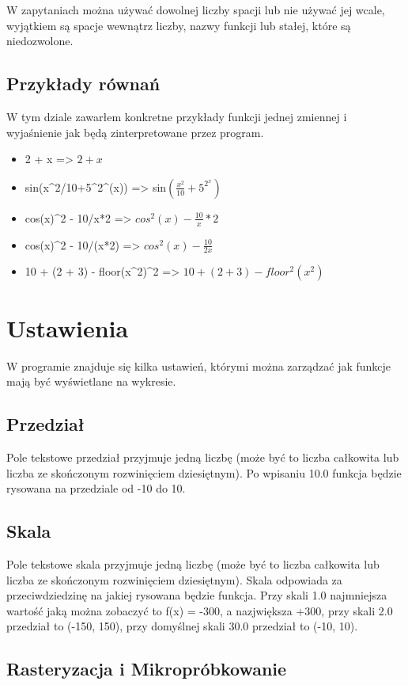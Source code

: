 \documentclass[a4paper]{article}
\begin{document}
W zapytaniach można używać dowolnej liczby spacji lub nie używać jej wcale, wyjątkiem są spacje wewnątrz liczby, nazwy funkcji lub stałej, które są niedozwolone.

\subsection{Przykłady równań}

W tym dziale zawarłem konkretne przykłady funkcji jednej zmiennej i wyjaśnienie jak będą zinterpretowane przez program.

\begin{itemize}
    \item 2 + x => $2 + x$
    \item sin(x\^{}2/10+5\^{}2\^{}(x)) => sin$(\frac{x^2}{10} + 5^{2^x})$
    \item cos(x)\^{}2 - 10/x*2 => $cos^2 (x) - \frac{10}{x} * 2$
    \item cos(x)\^{}2 - 10/(x*2) => $cos^2 (x) - \frac{10}{2x}$
    \item 10 + (2 + 3) - floor(x\^{}2)\^{}2 => $10 + (2 + 3) - floor^2(x^2)$
\end{itemize}

\section{Ustawienia}
W programie znajduje się kilka ustawień, którymi można zarządzać jak funkcje mają być wyświetlane na wykresie.
\subsection{Przedział}
Pole tekstowe przedział przyjmuje jedną liczbę (może być to liczba całkowita lub liczba ze skończonym rozwinięciem dziesiętnym). Po wpisaniu 10.0 funkcja będzie rysowana na przedziale od -10 do 10.
\subsection{Skala}
Pole tekstowe skala przyjmuje jedną liczbę (może być to liczba całkowita lub liczba ze skończonym rozwinięciem dziesiętnym). Skala odpowiada za przeciwdziedzinę na jakiej rysowana będzie funkcja. Przy skali 1.0 najmniejsza wartość jaką można zobaczyć to f(x) = -300, a nazjwiększa +300, przy skali 2.0 przedział to (-150, 150), przy domyślnej skali 30.0 przedział to (-10, 10).
\subsection{Rasteryzacja i Mikropróbkowanie}
\end{document}
